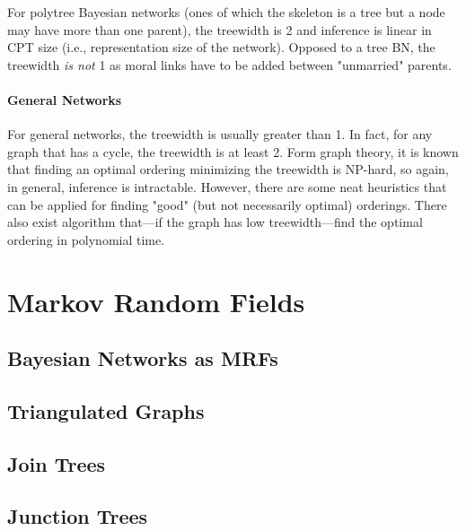 				For polytree Bayesian networks (ones of which the skeleton is a tree but a node may have more than one parent), the treewidth is \num{2} and inference is linear in CPT size (i.e., representation size of the network). Opposed to a tree BN, the treewidth \emph{is not} \num{1} as moral links have to be added between "unmarried" parents.

			\subsubsection{General Networks}
				For general networks, the treewidth is usually greater than \num{1}. In fact, for any graph that has a cycle, the treewidth is at least \num{2}. Form graph theory, it is known that finding an optimal ordering minimizing the treewidth is NP-hard, so again, in general, inference is intractable. However, there are some neat heuristics that can be applied for finding "good" (but not necessarily optimal) orderings. There also exist algorithm that---if the graph has low treewidth---find the optimal ordering in polynomial time.

\chapter{Markov Random Fields} %

	\section{Bayesian Networks as MRFs} %
		\label{sec:towardsMarkovRandomFields}


	\section{Triangulated Graphs} %

	\section{Join Trees} %

	\section{Junction Trees} %
		\label{sec:junctionTrees}

